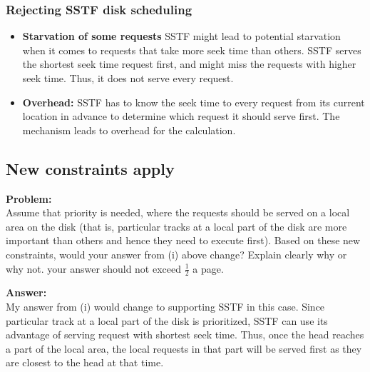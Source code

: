 \subsubsection{Rejecting SSTF disk scheduling}
\begin{itemize}
    \item \textbf{Starvation of some requests} SSTF might lead to potential starvation when it comes to requests that take more seek time than others. SSTF serves the shortest seek time request first, and might miss the requests with higher seek time. Thus, it does not serve every request.
    \item \textbf{Overhead: } SSTF has to know the seek time to every request from its current location in advance to determine which request it should serve first. The mechanism leads to overhead for the calculation. 
\end{itemize}

\subsection{New constraints apply}
\textbf{Problem:} \\
Assume that priority is needed, where the requests should be served on a local area on the
disk (that is, particular tracks at a local part of the disk are more important than others and
hence they need to execute first). Based on these new constraints, would your answer from
(i) above change? Explain clearly why or why not. your answer should not exceed $\frac{1}{2}$ a page.

\textbf{Answer:} \\
My answer from (i) would change to supporting SSTF in this case. Since particular track at a local part of the disk is prioritized, SSTF can use its advantage of serving request with shortest seek time. Thus, once the head reaches a part of the local area, the local requests in that part will be served first as they are closest to the head at that time.


